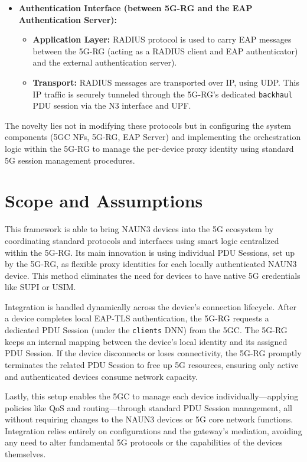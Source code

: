 \begin{itemize}
{\begin{itemize}
        \end{itemize}
    }
    \item {
        \textbf{Authentication Interface (between \ac{5G-RG} and the \ac{EAP} Authentication Server):}
        \begin{itemize}
            \item \textbf{Application Layer:} \ac{RADIUS} protocol is used to carry \ac{EAP} messages between the \ac{5G-RG} (acting as a \ac{RADIUS} client and \ac{EAP} authenticator) and the external authentication server).
            \item \textbf{Transport:} \ac{RADIUS} messages are transported over \ac{IP}, using \ac{UDP}. This \ac{IP} traffic is securely tunneled through the \ac{5G-RG}'s dedicated \texttt{backhaul} \ac{PDU} session via the N3 interface and \ac{UPF}.
        \end{itemize}
    }
\end{itemize}

The novelty lies not in modifying these protocols but in configuring the system components (\ac{5GC} \acp{NF}, \ac{5G-RG}, \ac{EAP} Server) and implementing the orchestration logic within the \ac{5G-RG} to manage the per-device proxy identity using standard \ac{5G} session management procedures.

\section{Scope and Assumptions}

This framework is able to bring \ac{NAUN3} devices into the \ac{5G} ecosystem by coordinating standard protocols and interfaces using smart logic centralized within the \ac{5G-RG}. Its main innovation is using individual \ac{PDU} Sessions, set up by the \ac{5G-RG}, as flexible proxy identities for each locally authenticated \ac{NAUN3} device. This method eliminates the need for devices to have native \ac{5G} credentials like \ac{SUPI} or \ac{USIM}.

Integration is handled dynamically across the device's connection lifecycle. After a device completes local \ac{EAP-TLS} authentication, the \ac{5G-RG} requests a dedicated \ac{PDU} Session (under the \texttt{clients} \ac{DNN}) from the \ac{5GC}. The \ac{5G-RG} keeps an internal mapping between the device's local identity and its assigned \ac{PDU} Session. If the device disconnects or loses connectivity, the \ac{5G-RG} promptly terminates the related \ac{PDU} Session to free up \ac{5G} resources, ensuring only active and authenticated devices consume network capacity.

Lastly, this setup enables the \ac{5GC} to manage each device individually—applying policies like \ac{QoS} and routing—through standard \ac{PDU} Session management, all without requiring changes to the \ac{NAUN3} devices or \ac{5G} core network functions. Integration relies entirely on configurations and the gateway's mediation, avoiding any need to alter fundamental \ac{5G} protocols or the capabilities of the devices themselves.